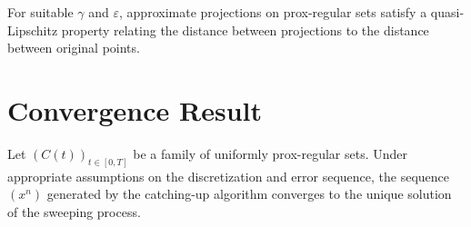 \begin{proposition}
\label{prop:quasi_lipschitz}
For suitable $\gamma$ and $\varepsilon$, approximate projections on prox-regular sets satisfy a quasi-Lipschitz property relating the distance between projections to the distance between original points.
\end{proposition}

\section{Convergence Result}

\begin{theorem}
\label{thm:convergence_prox_regular}
\leanok
{}
Let $(C(t))_{t\in[0,T]}$ be a family of uniformly prox-regular sets. Under appropriate assumptions on the discretization and error sequence, the sequence $(x^n)$ generated by the catching-up algorithm converges to the unique solution of the sweeping process.
\end{theorem}
